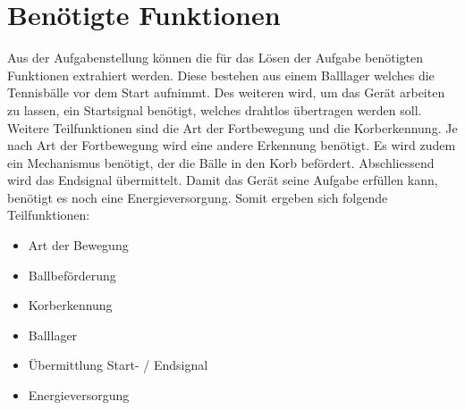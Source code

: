 \section{Benötigte Funktionen}
Aus der Aufgabenstellung können die für das Lösen der Aufgabe benötigten 
Funktionen extrahiert werden.  Diese bestehen aus einem Balllager welches die 
Tennisbälle vor dem Start aufnimmt. Des weiteren wird, um das Gerät arbeiten 
zu lassen, ein Startsignal benötigt, welches drahtlos übertragen werden soll. 
Weitere Teilfunktionen sind die Art der Fortbewegung und die Korberkennung. Je 
nach Art der Fortbewegung wird eine andere Erkennung benötigt. Es wird zudem 
ein Mechanismus benötigt, der die Bälle in den Korb befördert.  Abschliessend 
wird das Endsignal übermittelt.  Damit das Gerät seine Aufgabe erfüllen kann, 
benötigt es noch eine Energieversorgung.  Somit ergeben sich folgende 
Teilfunktionen:

\begin{itemize}
    \item Art der Bewegung
    \item Ballbeförderung
    \item Korberkennung
    \item Balllager
    \item Übermittlung Start- / Endsignal
    \item Energieversorgung
\end{itemize}

